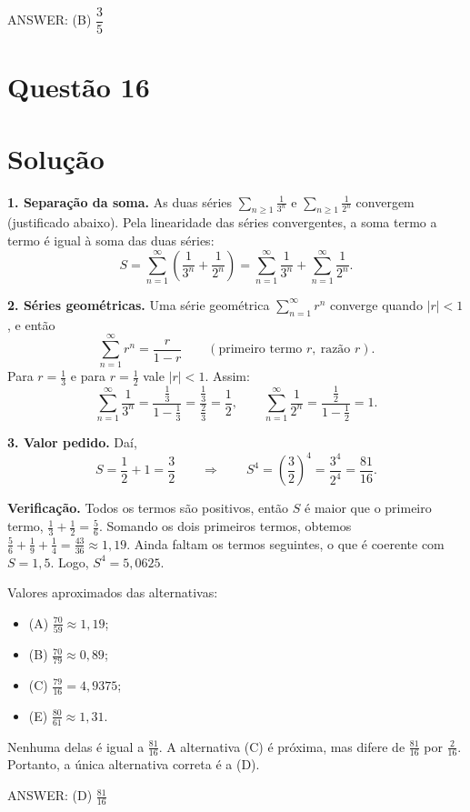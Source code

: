 \documentclass{article}%
\begin{document}
ANSWER: (B) $\dfrac{3}{5}$%
\newpage%
\section*{Questão 16}

\section*{Solução}

\textbf{1. Separação da soma.} As duas séries $\sum_{n\ge 1} \frac{1}{3^n}$ e $\sum_{n\ge 1} \frac{1}{2^n}$ convergem (justificado abaixo). Pela linearidade das séries convergentes, a soma termo a termo é igual à soma das duas séries:
\[
S=\sum_{n=1}^{\infty}\left(\frac{1}{3^n}+\frac{1}{2^n}\right)=\sum_{n=1}^{\infty}\frac{1}{3^n}+\sum_{n=1}^{\infty}\frac{1}{2^n}.
\]

\textbf{2. Séries geométricas.} Uma série geométrica $\sum_{n=1}^{\infty} r^n$ converge quando $|r|<1$, e então
\[
\sum_{n=1}^{\infty} r^n=\frac{r}{1-r}\qquad(\text{primeiro termo } r,\ \text{razão } r).
\]
Para $r=\frac13$ e para $r=\frac12$ vale $|r|<1$. Assim:
\[
\sum_{n=1}^{\infty}\frac{1}{3^n}=\frac{\frac13}{1-\frac13}=\frac{\frac13}{\frac23}=\frac12,
\qquad
\sum_{n=1}^{\infty}\frac{1}{2^n}=\frac{\frac12}{1-\frac12}=1.
\]

\textbf{3. Valor pedido.} Daí,
\[
S=\frac12+1=\frac32
\qquad\Longrightarrow\qquad
S^4=\left(\frac32\right)^4=\frac{3^4}{2^4}=\frac{81}{16}.
\]

\textbf{Verificação.} Todos os termos são positivos, então $S$ é maior que o primeiro termo, $\frac13+\frac12=\frac56$. Somando os dois primeiros termos, obtemos $\frac56+\frac19+\frac14=\frac{43}{36}\approx 1{,}19$. Ainda faltam os termos seguintes, o que é coerente com $S=1{,}5$. Logo, $S^4=5{,}0625$.

Valores aproximados das alternativas:
\begin{itemize}
\item (A) $\frac{70}{59}\approx 1{,}19$;
\item (B) $\frac{70}{79}\approx 0{,}89$;
\item (C) $\frac{79}{16}=4{,}9375$;
\item (E) $\frac{80}{61}\approx 1{,}31$.
\end{itemize}
Nenhuma delas é igual a $\frac{81}{16}$. A alternativa (C) é próxima, mas difere de $\frac{81}{16}$ por $\frac{2}{16}$. Portanto, a única alternativa correta é a (D).

ANSWER: (D) $\frac{81}{16}$%
\newpage%
\end{document}
